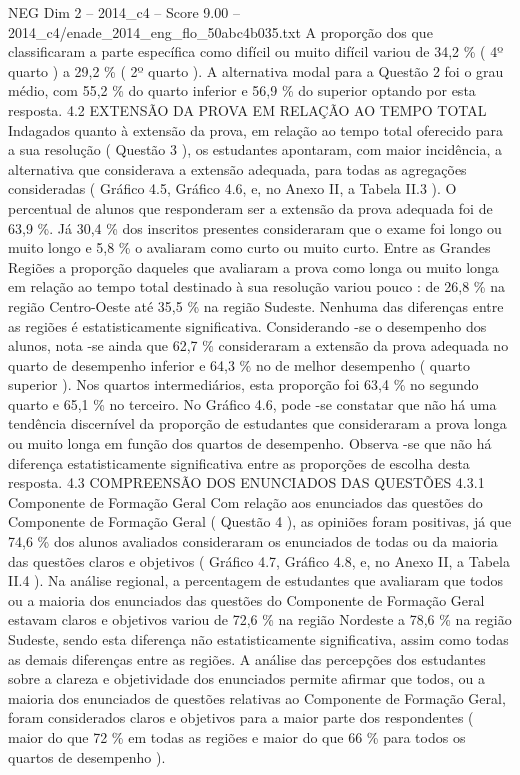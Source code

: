 \begin{textsample}{NEG Dim 2 – 2014\_c4 – Score 9.00 – 2014\_c4/enade\_2014\_eng\_flo\_50abc4b035.txt}
A proporção dos que classificaram a parte específica como difícil ou muito difícil variou de 34,2 \% ( 4º quarto ) a 29,2 \% ( 2º quarto ).
A alternativa modal para a Questão 2 foi o grau médio, com 55,2 \% do quarto inferior e 56,9 \% do superior optando por esta resposta. 4.2 EXTENSÃO DA PROVA EM RELAÇÃO AO TEMPO TOTAL Indagados quanto à extensão da prova, em relação ao tempo total oferecido para a sua resolução ( Questão 3 ), os estudantes apontaram, com maior incidência, a alternativa que considerava a extensão adequada, para todas as agregações consideradas ( Gráfico 4.5, Gráfico 4.6, e, no Anexo II, a Tabela II.3 ).
O percentual de alunos que responderam ser a extensão da prova adequada foi de 63,9 \%.
Já 30,4 \% dos inscritos presentes consideraram que o exame foi longo ou muito longo e 5,8 \% o avaliaram como curto ou muito curto.
Entre as Grandes Regiões a proporção daqueles que avaliaram a prova como longa ou muito longa em relação ao tempo total destinado à sua resolução variou pouco : de 26,8 \% na região Centro-Oeste até 35,5 \% na região Sudeste.
Nenhuma das diferenças entre as regiões é estatisticamente significativa.
Considerando -se o desempenho dos alunos, nota -se ainda que 62,7 \% consideraram a extensão da prova adequada no quarto de desempenho inferior e 64,3 \% no de melhor desempenho ( quarto superior ).
Nos quartos intermediários, esta proporção foi 63,4 \% no segundo quarto e 65,1 \% no terceiro.
No Gráfico 4.6, pode -se constatar que não há uma tendência discernível da proporção de estudantes que consideraram a prova longa ou muito longa em função dos quartos de desempenho.
Observa -se que não há diferença estatisticamente significativa entre as proporções de escolha desta resposta. 4.3 COMPREENSÃO DOS ENUNCIADOS DAS QUESTÕES 4.3.1 Componente de Formação Geral Com relação aos enunciados das questões do Componente de Formação Geral ( Questão 4 ), as opiniões foram positivas, já que 74,6 \% dos alunos avaliados consideraram os enunciados de todas ou da maioria das questões claros e objetivos ( Gráfico 4.7, Gráfico 4.8, e, no Anexo II, a Tabela II.4 ).
Na análise regional, a percentagem de estudantes que avaliaram que todos ou a maioria dos enunciados das questões do Componente de Formação Geral estavam claros e objetivos variou de 72,6 \% na região Nordeste a 78,6 \% na região Sudeste, sendo esta diferença não estatisticamente significativa, assim como todas as demais diferenças entre as regiões.
A análise das percepções dos estudantes sobre a clareza e objetividade dos enunciados permite afirmar que todos, ou a maioria dos enunciados de questões relativas ao Componente de Formação Geral, foram considerados claros e objetivos para a maior parte dos respondentes ( maior do que 72 \% em todas as regiões e maior do que 66 \% para todos os quartos de desempenho ).

\end{textsample}
